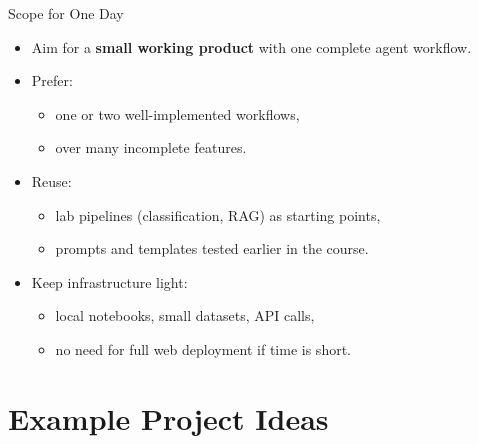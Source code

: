 \documentclass[aspectratio=169]{beamer}
\begin{document}
\begin{frame}{Scope for One Day}
  \begin{itemize}
    \item Aim for a \textbf{small working product} with one complete agent workflow.
    \item Prefer:
      \begin{itemize}
        \item one or two well-implemented workflows,
        \item over many incomplete features.
      \end{itemize}
    \item Reuse:
      \begin{itemize}
        \item lab pipelines (classification, RAG) as starting points,
        \item prompts and templates tested earlier in the course.
      \end{itemize}
    \item Keep infrastructure light:
      \begin{itemize}
        \item local notebooks, small datasets, API calls,
        \item no need for full web deployment if time is short.
      \end{itemize}
  \end{itemize}
\end{frame}

\section{Example Project Ideas}
\end{document}
